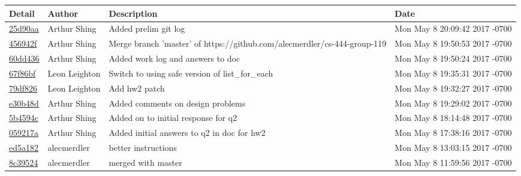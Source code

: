 \begin{tabular}{l l l l}\textbf{Detail} & \textbf{Author} & \textbf{Description} & \textbf{Date}\\\hline
\href{https://github.com/alecmerdler/cs-444-group-119/commit/25d90aae79f7ceb874554d67026829a300ab3d50}{25d90aa} & Arthur Shing & Added prelim git log & Mon May 8 20:09:42 2017 -0700\\\hline
\href{https://github.com/alecmerdler/cs-444-group-119/commit/456942fda5111035b42a118f86a8e811bda3ffdf}{456942f} & Arthur Shing & Merge branch 'master' of https://github.com/alecmerdler/cs-444-group-119 & Mon May 8 19:50:53 2017 -0700\\\hline
\href{https://github.com/alecmerdler/cs-444-group-119/commit/60dd43672b1c067427b0c275edec8d4ef9568fc4}{60dd436} & Arthur Shing & Added work log and answers to doc & Mon May 8 19:50:24 2017 -0700\\\hline
\href{https://github.com/alecmerdler/cs-444-group-119/commit/67f86bf465869f022751513f37527d58e15154e0}{67f86bf} & Leon Leighton & Switch to using safe version of list\_for\_each & Mon May 8 19:35:31 2017 -0700\\\hline
\href{https://github.com/alecmerdler/cs-444-group-119/commit/79df82650202a8951da4631a95190ab6efad0eb3}{79df826} & Leon Leighton & Add hw2 patch & Mon May 8 19:32:27 2017 -0700\\\hline
\href{https://github.com/alecmerdler/cs-444-group-119/commit/e30b48dcef3106f78ae673403bb5f29fae81ba88}{e30b48d} & Arthur Shing & Added comments on design problems & Mon May 8 19:29:02 2017 -0700\\\hline
\href{https://github.com/alecmerdler/cs-444-group-119/commit/5b4594c759d329266cf338240b7875263bc632d3}{5b4594c} & Arthur Shing & Added on to initial response for q2 & Mon May 8 18:14:48 2017 -0700\\\hline
\href{https://github.com/alecmerdler/cs-444-group-119/commit/059217a984ffbe3e3b44d015cbe592319b3dba6e}{059217a} & Arthur Shing & Added initial answers to q2 in doc for hw2 & Mon May 8 17:38:16 2017 -0700\\\hline
\href{https://github.com/alecmerdler/cs-444-group-119/commit/ed5a182d9e86faa8346f54f462fc370ef2b35c82}{ed5a182} & alecmerdler & better instructions & Mon May 8 13:03:15 2017 -0700\\\hline
\href{https://github.com/alecmerdler/cs-444-group-119/commit/8c395243ec5da5de07dcea98c75f0f8e2a0738ba}{8c39524} & alecmerdler & merged with master & Mon May 8 11:59:56 2017 -0700\\\hline

\end{tabular}
